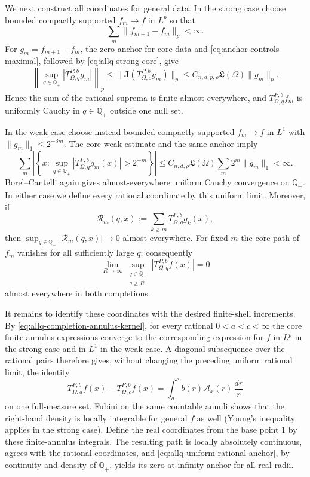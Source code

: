 \documentclass[11pt]{article}
\numberwithin{equation}{section}
\theoremstyle{remark}
\theoremstyle{definition}
\begin{document}
We next construct all coordinates for general data.  In the strong case
choose bounded compactly supported $f_m\to f$ in $L^p$ so that
\[
 \sum_m\|f_{m+1}-f_m\|_p<\infty.
\]
For $g_m=f_{m+1}-f_m$, the zero anchor for core data and
\eqref{eq:anchor-controls-maximal}, followed by
\eqref{eq:allq-strong-core}, give
\begin{equation}\label{eq:allq-strong-uniform-completion}
 \left\|\sup_{q\in\mathbb Q_+}
       |T^{P,b}_{\Omega,q}g_m|\right\|_p
 \le \|\mathbf J(T^{P,b}_{\Omega,\varepsilon}g_m)\|_p
 \le C_{n,d,p,\rho}\mathfrak L(\Omega)\|g_m\|_p.
\end{equation}
Hence the sum of the rational suprema is finite almost everywhere, and
$T^{P,b}_{\Omega,q}f_m$ is uniformly Cauchy in
$q\in\mathbb Q_+$ outside one null set.

In the weak case choose instead bounded compactly supported $f_m\to f$
in $L^1$ with $\|g_m\|_1\le2^{-3m}$.  The core weak estimate and the
same anchor imply
\begin{equation}\label{eq:allq-weak-borel-cantelli}
 \sum_m\left|\left\{x:
   \sup_{q\in\mathbb Q_+}|T^{P,b}_{\Omega,q}g_m(x)|>2^{-m}
 \right\}\right|
 \le C_{n,d,\rho}\mathfrak L(\Omega)
       \sum_m2^m\|g_m\|_1<\infty.
\end{equation}
Borel--Cantelli again gives almost-everywhere uniform Cauchy convergence
on $\mathbb Q_+$.  In either case we define every rational coordinate by
this uniform limit.  Moreover, if
\[
 \mathcal R_m(q,x)
 :=\sum_{k\ge m}T^{P,b}_{\Omega,q}g_k(x),
\]
then $\sup_{q\in\mathbb Q_+}|\mathcal R_m(q,x)|\to0$ almost everywhere.
For fixed $m$ the core path of $f_m$ vanishes for all sufficiently large
$q$; consequently
\begin{equation}\label{eq:allq-uniform-rational-anchor}
 \lim_{R\to\infty}
 \sup_{\substack{q\in\mathbb Q_+\\q\ge R}}
 |T^{P,b}_{\Omega,q}f(x)|=0
\end{equation}
almost everywhere in both completions.

It remains to identify these coordinates with the desired finite-shell
increments.  By \eqref{eq:allq-completion-annulus-kernel}, for every
rational $0<a<c<\infty$ the core finite-annulus expressions converge to
the corresponding expression for $f$ in $L^p$ in the strong case and in
$L^1$ in the weak case.  A diagonal subsequence over the rational pairs
therefore gives, without changing the preceding uniform rational limit,
the identity
\[
 T^{P,b}_{\Omega,a}f(x)-T^{P,b}_{\Omega,c}f(x)
 =\int_a^c b(r)\mathcal A_x(r)\,\frac{dr}{r}
\]
on one full-measure set.  Fubini on the same countable annuli shows that
the right-hand density is locally integrable for general $f$ as well
(Young's inequality applies in the strong case).  Define the real
coordinates from the base point $1$ by these finite-annulus integrals.
The resulting path is locally absolutely continuous, agrees with the
rational coordinates, and \eqref{eq:allq-uniform-rational-anchor}, by
continuity and density of $\mathbb Q_+$, yields its zero-at-infinity
anchor for all real radii.
\end{document}
